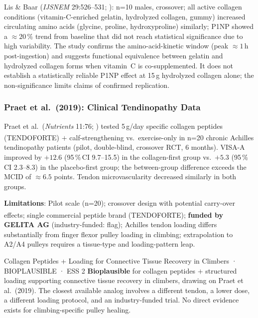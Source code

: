 Lis \& Baar (\textit{IJSNEM} 29:526--531; \cite{LB19}): n=10 males, crossover; all active collagen conditions (vitamin-C-enriched gelatin, hydrolyzed collagen, gummy) increased circulating amino acids (glycine, proline, hydroxyproline) similarly; P1NP showed a ${\approx}20\,\%$ trend from baseline that did not reach statistical significance due to high variability. The study confirms the amino-acid-kinetic window (peak ${\approx}1$\,h post-ingestion) and suggests functional equivalence between gelatin and hydrolyzed collagen forms when vitamin~C is co-supplemented. It does not establish a statistically reliable P1NP effect at 15\,g hydrolyzed collagen alone; the non-significance limits claims of confirmed replication.

\subsubsection{Praet et al.\ (2019): Clinical Tendinopathy Data}

Praet et al.\ (\textit{Nutrients} 11:76; \cite{PPWE19}) tested 5\,g/day specific collagen peptides (TENDOFORTE\textsuperscript{\textregistered}) $+$ calf-strengthening vs.\ exercise-only in n=20 chronic Achilles tendinopathy patients (pilot, double-blind, crossover RCT, 6 months). VISA-A improved by $+12.6$ (95\,\%\,CI 9.7--15.5) in the collagen-first group vs.\ $+5.3$ (95\,\%\,CI 2.3--8.3) in the placebo-first group; the between-group difference exceeds the MCID of ${\approx}6.5$ points. Tendon microvascularity decreased similarly in both groups.

\textbf{Limitations}: Pilot scale (n=20); crossover design with potential carry-over effects; single commercial peptide brand (TENDOFORTE\textsuperscript{\textregistered}); \textbf{funded by GELITA AG} (industry-funded: flag); Achilles tendon loading differs substantially from finger flexor pulley loading in climbing; extrapolation to A2/A4 pulleys requires a tissue-type and loading-pattern leap.

\begin{bioplausbox}{Collagen Peptides + Loading for Connective Tissue Recovery in Climbers · BIOPLAUSIBLE · ESS 2}
\textbf{Bioplausible} for collagen peptides $+$ structured loading supporting connective tissue recovery in climbers, drawing on Praet et al.\ (2019). The closest available analog involves a different tendon, a lower dose, a different loading protocol, and an industry-funded trial. No direct evidence exists for climbing-specific pulley healing.
\end{bioplausbox}

